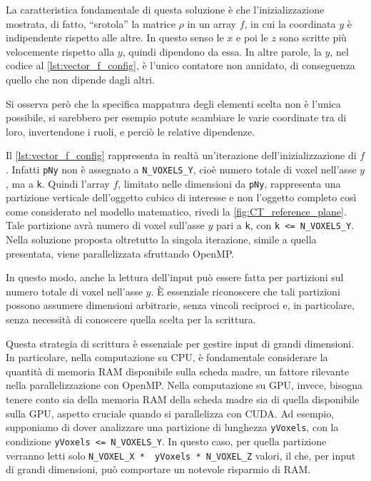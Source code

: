 \documentclass[12pt,a4paper]{report}
\begin{document}
La caratteristica fondamentale di questa soluzione è che l'inizializzazione mostrata, di fatto, ``srotola'' la matrice
\(\rho\) in un array \(f\), in cui la coordinata \(y\) è indipendente rispetto alle altre.
In questo senso le \(x\) e poi le \(z\) sono scritte più velocemente rispetto alla \(y\), quindi dipendono da essa.
In altre parole, la \(y\), nel codice al \autoref{lst:vector_f_config}, è l'unico contatore non annidato, di conseguenza quello
che non dipende dagli altri.

Si osserva però che la specifica mappatura degli elementi scelta non è l'unica possibile, si sarebbero per esempio potute
scambiare le varie coordinate tra di loro, invertendone i ruoli, e perciò le relative dipendenze.

Il \autoref{lst:vector_f_config} rappresenta in realtà un'iterazione dell'inizializzazione di \(f\).
Infatti \lstinline{pNy} non è assegnato a \mbox{\lstinline{N_VOXELS_Y},} cioè numero totale di voxel nell'asse \(y\), ma a
\mbox{\lstinline{k}.}
Quindi l'array \(f\), limitato nelle dimensioni da \mbox{\lstinline{pNy},} rappresenta una partizione verticale dell'oggetto
cubico di interesse e non l'oggetto completo così come considerato nel modello matematico, rivedi la
\autoref{fig:CT_reference_plane}.
Tale partizione avrà numero di voxel sull'asse \(y\) pari a \mbox{\lstinline{k},} con \mbox{\lstinline{k <= N_VOXELS_Y}.}
Nella soluzione proposta oltretutto la singola iterazione, simile a quella presentata, viene parallelizzata sfruttando OpenMP.

In questo modo, anche la lettura dell'input può essere fatta per partizioni sul numero totale di voxel nell'asse \(y\).
È essenziale riconoscere che tali partizioni possono assumere dimensioni arbitrarie, senza vincoli reciproci e, in particolare,
senza necessità di conoscere quella scelta per la scrittura.

Questa strategia di scrittura è essenziale per gestire input di grandi dimensioni.
In particolare, nella computazione su CPU, è fondamentale considerare la quantità di memoria RAM disponibile sulla scheda madre,
un fattore rilevante nella parallelizzazione con OpenMP.
Nella computazione su GPU, invece, bisogna tenere conto sia della memoria RAM della scheda madre sia di quella disponibile sulla
GPU, aspetto cruciale quando si parallelizza con CUDA.
Ad esempio, supponiamo di dover analizzare una partizione di lunghezza \mbox{\lstinline{yVoxels},} con la condizione
\mbox{\lstinline{yVoxels <= N_VOXELS_Y}.}
In questo caso, per quella partizione verranno letti solo \lstinline{N_VOXEL_X *  yVoxels * N_VOXEL_Z} valori, il che, per input
di grandi dimensioni, può comportare un notevole risparmio di RAM.
\end{document}
